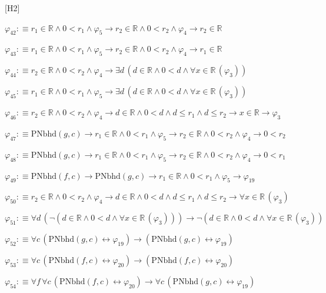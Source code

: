 \begin{fullproof}{[H2]}
\begin{abbrevlist}
\item $\varphi_{42} :\equiv r_{1} \in \mathbb{R} \land 0 < r_{1} \land \varphi_{5} \to r_{2} \in \mathbb{R} \land 0 < r_{2} \land \varphi_{4} \to r_{2} \in \mathbb{R}$
\item $\varphi_{43} :\equiv r_{1} \in \mathbb{R} \land 0 < r_{1} \land \varphi_{5} \to r_{2} \in \mathbb{R} \land 0 < r_{2} \land \varphi_{4} \to r_{1} \in \mathbb{R}$
\item $\varphi_{44} :\equiv r_{2} \in \mathbb{R} \land 0 < r_{2} \land \varphi_{4} \to \exists d\,(d \in \mathbb{R} \land 0 < d \land \forall x \in \mathbb{R}\,(\varphi_{3}))$
\item $\varphi_{45} :\equiv r_{1} \in \mathbb{R} \land 0 < r_{1} \land \varphi_{5} \to \exists d\,(d \in \mathbb{R} \land 0 < d \land \forall x \in \mathbb{R}\,(\varphi_{3}))$
\item $\varphi_{46} :\equiv r_{2} \in \mathbb{R} \land 0 < r_{2} \land \varphi_{4} \to d \in \mathbb{R} \land 0 < d \land d \leq r_{1} \land d \leq r_{2} \to x \in \mathbb{R} \to \varphi_{3}$
\item $\varphi_{47} :\equiv \mathrm{PNbhd}(g,c) \to r_{1} \in \mathbb{R} \land 0 < r_{1} \land \varphi_{5} \to r_{2} \in \mathbb{R} \land 0 < r_{2} \land \varphi_{4} \to 0 < r_{2}$
\item $\varphi_{48} :\equiv \mathrm{PNbhd}(g,c) \to r_{1} \in \mathbb{R} \land 0 < r_{1} \land \varphi_{5} \to r_{2} \in \mathbb{R} \land 0 < r_{2} \land \varphi_{4} \to 0 < r_{1}$
\item $\varphi_{49} :\equiv \mathrm{PNbhd}(f,c) \to \mathrm{PNbhd}(g,c) \to r_{1} \in \mathbb{R} \land 0 < r_{1} \land \varphi_{5} \to \varphi_{19}$
\item $\varphi_{50} :\equiv r_{2} \in \mathbb{R} \land 0 < r_{2} \land \varphi_{4} \to d \in \mathbb{R} \land 0 < d \land d \leq r_{1} \land d \leq r_{2} \to \forall x \in \mathbb{R}\,(\varphi_{3})$
\item $\varphi_{51} :\equiv \forall d\,(\neg (d \in \mathbb{R} \land 0 < d \land \forall x \in \mathbb{R}\,(\varphi_{3}))) \to \neg (d \in \mathbb{R} \land 0 < d \land \forall x \in \mathbb{R}\,(\varphi_{3}))$
\item $\varphi_{52} :\equiv \forall c\,(\mathrm{PNbhd}(g,c) \leftrightarrow \varphi_{19}) \to (\mathrm{PNbhd}(g,c) \leftrightarrow \varphi_{19})$
\item $\varphi_{53} :\equiv \forall c\,(\mathrm{PNbhd}(f,c) \leftrightarrow \varphi_{20}) \to (\mathrm{PNbhd}(f,c) \leftrightarrow \varphi_{20})$
\item $\varphi_{54} :\equiv \forall f\,\forall c\,(\mathrm{PNbhd}(f,c) \leftrightarrow \varphi_{20}) \to \forall c\,(\mathrm{PNbhd}(g,c) \leftrightarrow \varphi_{19})$

\end{abbrevlist}
\end{fullproof}
